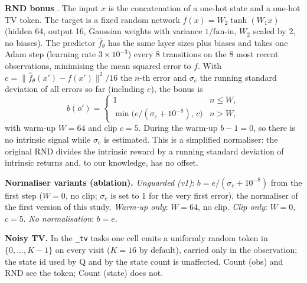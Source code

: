 \textbf{RND bonus} \cite{burda2018exploration}. The input $x$ is the concatenation of a one-hot state and a one-hot TV token. The target is a fixed random network $f(x)=W_2\tanh(W_1x)$ (hidden 64, output 16, Gaussian weights with variance $1/\text{fan-in}$, $W_2$ scaled by 2, no biases). The predictor $\hat f_\theta$ has the same layer sizes plus biases and takes one Adam step (learning rate $3\times10^{-3}$) every 8 transitions on the 8 most recent observations, minimising the mean squared error to $f$. With $e=\|\hat f_\theta(x')-f(x')\|^2/16$ the $n$-th error and $\sigma_e$ the running standard deviation of all errors so far (including $e$), the bonus is
\begin{equation}
b(o') = \begin{cases}1 & n\leq W,\\ \min\!\big(e/(\sigma_e+10^{-8}),\,c\big) & n>W,\end{cases}\label{eq:rnd}
\end{equation}
with warm-up $W=64$ and clip $c=5$. During the warm-up $b-1=0$, so there is no intrinsic signal while $\sigma_e$ is estimated. This is a simplified normaliser: the original RND divides the intrinsic reward by a running standard deviation of intrinsic returns \cite{burda2018exploration} and, to our knowledge, has no offset.

\textbf{Normaliser variants (ablation).} \emph{Unguarded (v1)}: $b=e/(\sigma_e+10^{-8})$ from the first step ($W=0$, no clip; $\sigma_e$ is set to 1 for the very first error), the normaliser of the first version of this study. \emph{Warm-up only}: $W=64$, no clip. \emph{Clip only}: $W=0$, $c=5$. \emph{No normalisation}: $b=e$.

\textbf{Noisy TV.} In the \texttt{\_tv} tasks one cell emits a uniformly random token in $\{0,\dots,K-1\}$ on every visit ($K=16$ by default), carried only in the observation; the state id used by Q and by the state count is unaffected. Count (obs) and RND see the token; Count (state) does not.

